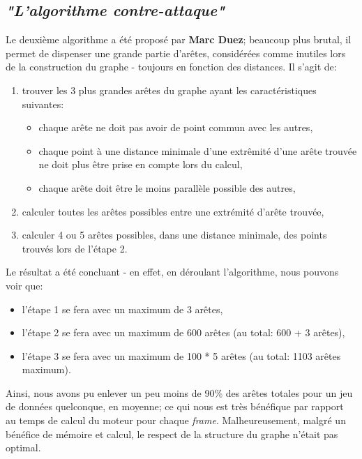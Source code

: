 \documentclass[pdftex,12pt,a4paper]{report}
\begin{document}
\begin{spacing}{1.2}
\subsection{\textit{"L'algorithme contre-attaque"}}
Le deuxième algorithme a été proposé par \textbf{Marc Duez}; beaucoup plus brutal, il permet de dispenser une grande partie d'arêtes, considérées comme inutiles lors de la construction du graphe - toujours en fonction des distances.
\newline
Il s'agit de:
\begin{enumerate}
\item trouver les 3 plus grandes arêtes du graphe ayant les caractéristiques suivantes:
	\begin{itemize}
	\item chaque arête ne doit pas avoir de point commun avec les autres,
	\item chaque point à une distance minimale d'une extrêmité d'une arête trouvée ne doit plus être prise en compte lors du calcul,
	\item chaque arête doit être le moins parallèle possible des autres,
	\end{itemize}
\item calculer toutes les arêtes possibles entre une extrémité d'arête trouvée,
\item calculer 4 ou 5 arêtes possibles, dans une distance minimale, des points trouvés lors de l'étape 2.
\end{enumerate}
Le résultat a été concluant - en effet, en déroulant l'algorithme, nous pouvons voir que:
\begin{itemize}
\item l'étape 1 se fera avec un maximum de 3 arêtes,
\item l'étape 2 se fera avec un maximum de 600 arêtes (au total: 600 + 3 arêtes),
\item l'étape 3 se fera avec un maximum de 100 * 5 arêtes (au total: 1103 arêtes maximum).
\end{itemize}
Ainsi, nous avons pu enlever un peu moins de 90\% des arêtes totales pour un jeu de données quelconque, en moyenne; ce qui nous est très bénéfique par rapport au temps de calcul du moteur pour chaque \textit{frame}. Malheureusement, malgré un bénéfice de mémoire et calcul, le respect de la structure du graphe n'était pas optimal.


\end{spacing}
\end{document}
